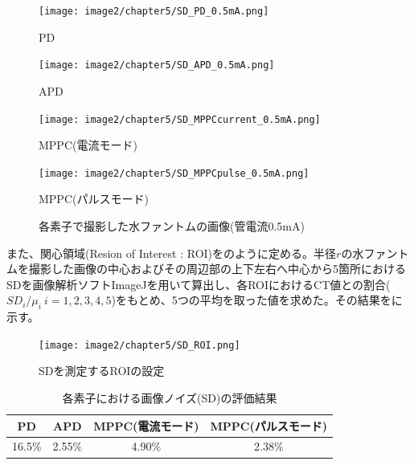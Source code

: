 \begin{figure}[H]
 \begin{minipage}{0.5\hsize}
  \begin{center}
   \texttt{[image: image2/chapter5/SD\_PD\_0.5mA.png]} 
  \end{center}
  \vspace{-1cm}
  \caption*{PD}
 \end{minipage}
 \begin{minipage}{0.5\hsize}
  \begin{center}
 \texttt{[image: image2/chapter5/SD\_APD\_0.5mA.png]} 
  \end{center}
  \vspace{-1cm}
  \caption*{APD}
 \end{minipage}
  \begin{minipage}{0.5\hsize}
  \begin{center}
 \texttt{[image: image2/chapter5/SD\_MPPCcurrent\_0.5mA.png]} 
  \end{center}
  \vspace{-1cm}
  \caption*{MPPC(電流モード)}
 \end{minipage}
  \begin{minipage}{0.5\hsize}
  \begin{center}
 \texttt{[image: image2/chapter5/SD\_MPPCpulse\_0.5mA.png]} 
  \end{center}
  \vspace{-1cm}
  \caption*{MPPC(パルスモード)}
 \end{minipage}
 \begin{center}
  \caption{各素子で撮影した水ファントムの画像(管電流0.5mA)}
  \label{fig:SD_result}
  \end{center}
\end{figure}

また、関心領域(Resion of Interest : ROI)をのように定める。半径$r$の水ファントムを撮影した画像の中心およびその周辺部の上下左右へ中心から5箇所におけるSDを画像解析ソフトImageJを用いて算出し、各ROIにおけるCT値との割合($SD_i/\mu_i\ i=1,2,3,4,5$)をもとめ、5つの平均を取った値を求めた。その結果をに示す。

\begin{figure}[H]
 \begin{center}
 \texttt{[image: image2/chapter5/SD\_ROI.png]} 
 \end{center}
 \caption{SDを測定するROIの設定}
 \label{fig:SD_ROI}
\end{figure}


\begin{table}[H]
  \centering
  \caption{各素子における画像ノイズ(SD)の評価結果}
    \begin{tabular}{cccc}
    \toprule
    PD    & APD   & MPPC(電流モード) & MPPC(パルスモード) \\
    \midrule
    16.5\% & 2.55\% & 4.90\% & 2.38\% \\
    \bottomrule
    \end{tabular}%
  \label{tab:addlabel}%
\end{table}%



